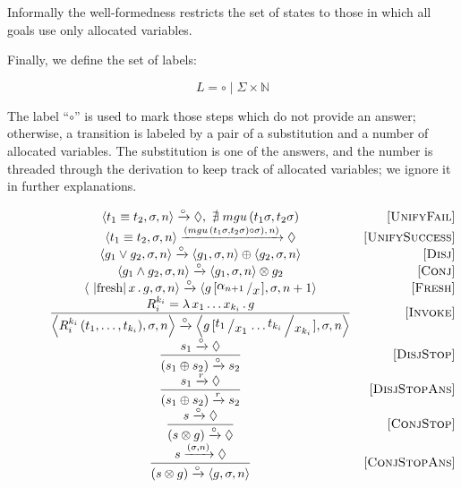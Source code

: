 Informally the well-formedness restricts the set of states to those in which all goals use only allocated variables.

Finally, we define the set of labels:

\[
L = \circ \mid \Sigma\times \mathbb{N}
\]

The label ``$\circ$'' is used to mark those steps which do not provide an answer; otherwise, a transition is labeled by a pair of a substitution and a number of allocated
variables. The substitution is one of the answers, and the number is threaded through the derivation to keep track of allocated variables; we ignore it in further explanations.

\begin{figure*}
  \renewcommand{\arraystretch}{1.6}
  \[
  \begin{array}{cr}
    \inbr{t_1 \equiv t_2, \sigma, n} \xrightarrow{\circ} \Diamond , \, \, \nexists\; mgu\,(t_1 \sigma, t_2 \sigma) &\ruleno{UnifyFail} \\
    \inbr{t_1 \equiv t_2, \sigma, n} \xrightarrow{(mgu\,(t_1 \sigma, t_2 \sigma) \circ \sigma),\, n)} \Diamond & \ruleno{UnifySuccess} \\
    \inbr{g_1 \lor g_2, \sigma, n} \xrightarrow{\circ} \inbr{g_1, \sigma, n} \oplus \inbr{g_2, \sigma, n} & \ruleno{Disj} \\
    \inbr{g_1 \land g_2, \sigma, n} \xrightarrow{\circ} \inbr{ g_1, \sigma, n} \otimes g_2 & \ruleno{Conj} \\
    \inbr{\mbox{\lstinline|fresh|}\, x\, .\, g, \sigma, n} \xrightarrow{\circ} \inbr{g\,[\bigslant{\alpha_{n + 1}}{x}], \sigma, n + 1} & \ruleno{Fresh} \\
    \dfrac{R_i^{k_i}=\lambda\,x_1\dots x_{k_i}\,.\,g}{\inbr{R_i^{k_i}\,(t_1,\dots,t_{k_i}),\sigma,n} \xrightarrow{\circ} \inbr{g\,[\bigslant{t_1}{x_1}\dots\bigslant{t_{k_i}}{x_{k_i}}], \sigma, n}} & \ruleno{Invoke}\\
    \dfrac{s_1 \xrightarrow{\circ} \Diamond}{(s_1 \oplus s_2) \xrightarrow{\circ} s_2} & \ruleno{DisjStop}\\
    \dfrac{s_1 \xrightarrow{r} \Diamond}{(s_1 \oplus s_2) \xrightarrow{r} s_2} & \ruleno{DisjStopAns}\\
    \dfrac{s \xrightarrow{\circ} \Diamond}{(s \otimes g) \xrightarrow{\circ} \Diamond} &\ruleno{ConjStop}\\
    \dfrac{s \xrightarrow{(\sigma, n)} \Diamond}{(s \otimes g) \xrightarrow{\circ} \inbr{g, \sigma, n}}  & \ruleno{ConjStopAns}\\

\end{array}\]
\end{figure*}
